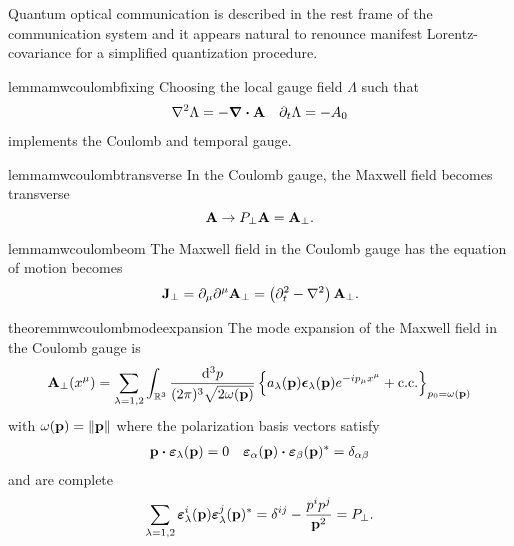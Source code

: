 Quantum optical communication is described in the rest frame of the communication system and it appears natural to renounce manifest Lorentz-covariance for a simplified quantization procedure.
\begin{restatable}{lemma}{mwcoulombfixing}
	Choosing the local gauge field $\Lambda$ such that
	\begin{align}
		\laplacian
		\Lambda
		=
		-
		\div\vb{A}
		&&
		\partial_t
		\Lambda
		=
		-
		A_0
	\end{align}
	implements the Coulomb and temporal gauge.
\end{restatable}
\begin{restatable}{lemma}{mwcoulombtransverse}
	In the Coulomb gauge, the Maxwell field becomes transverse
	\begin{equation}
		\vb{A}
		\to
		P_\perp
		\vb{A}
		=
		\vb{A}_\perp
		.
	\end{equation}
\end{restatable}
\begin{restatable}{lemma}{mwcoulombeom}\label{thm:mw_coulomb_eom}
	The Maxwell field in the Coulomb gauge has the equation of motion becomes
	\begin{equation}
		\vb{J}_\perp
		=
		\partial_\mu \partial^\mu
		\vb{A}_\perp
		=
		\left(
			\partial_t^2
			-
			\laplacian
		\right)
		\vb{A}_\perp
		\label{eq:mw_coulomb_eom}
		.
	\end{equation}
\end{restatable}
\begin{restatable}{theorem}{mwcoulombmodeexpansion}\label{thm:mw_coulomb_mode_expansion}
	The mode expansion of the Maxwell field in the Coulomb gauge is
	\begin{equation}
		\vb{A}_\perp(x^\mu)
		=
		\sum_{\lambda=1,2}
		\int_{\mathbb{R}^3}\frac{\dd[3]{p}}{(2\pi)^3\sqrt{2\omega(\vb{p})}}
		\left\{
			a_\lambda(\vb{p})
			\boldsymbol{\epsilon}_\lambda(\vb{p})
			e^{-ip_\mu x^\mu}
			+
			\text{c.c.}
		\right\}_{p_0=\omega(\vb{p})}
		\label{eq:mw_coulomb_mode_expansion}
	\end{equation}
	with $\omega(\vb{p})=\norm{\vb{p}}$ where the polarization basis vectors satisfy
	\begin{align}
		\vb{p}
		\vdot
		\boldsymbol{\varepsilon}_\lambda(\vb{p})
		=
		0
		&&
		\boldsymbol{\varepsilon}_\alpha(\vb{p})
		\vdot
		\boldsymbol{\varepsilon}_\beta(\vb{p})^*
		=
		\delta_{\alpha\beta}
		\label{eq:mw_coulomb_polarization_basis}
	\end{align}
	and are complete~\cite[p.~341]{Srednicki2007}
	\begin{equation}
		\sum_{\lambda=1,2}
		\boldsymbol{\varepsilon}_\lambda^i(\vb{p})
		\boldsymbol{\varepsilon}_\lambda^j(\vb{p})^*
		=
		\delta^{ij}
		-
		\frac{p^ip^j}{\vb{p}^2}
		=
		P_\perp
		\label{eq:mw_coulomb_polarization_complete}
		.
	\end{equation}
\end{restatable}
